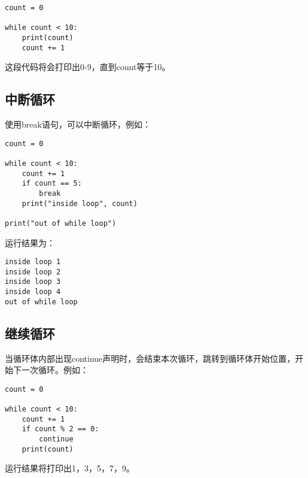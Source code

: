 \begin{lstlisting}
count = 0

while count < 10:
    print(count)
    count += 1
\end{lstlisting}

这段代码将会打印出0-9，直到count等于10。

\subsection{中断循环}
使用break语句，可以中断循环，例如：

\begin{lstlisting}
count = 0

while count < 10:
    count += 1
    if count == 5:
        break
    print("inside loop", count)

print("out of while loop")
\end{lstlisting}

运行结果为：

\begin{lstlisting}
inside loop 1
inside loop 2
inside loop 3
inside loop 4
out of while loop
\end{lstlisting}

\subsection{继续循环}
当循环体内部出现continue声明时，会结束本次循环，跳转到循环体开始位置，开始下一次循环。例如：

\begin{lstlisting}
count = 0

while count < 10:
    count += 1
    if count % 2 == 0:
        continue
    print(count)
\end{lstlisting}
运行结果将打印出1，3，5，7，9。
